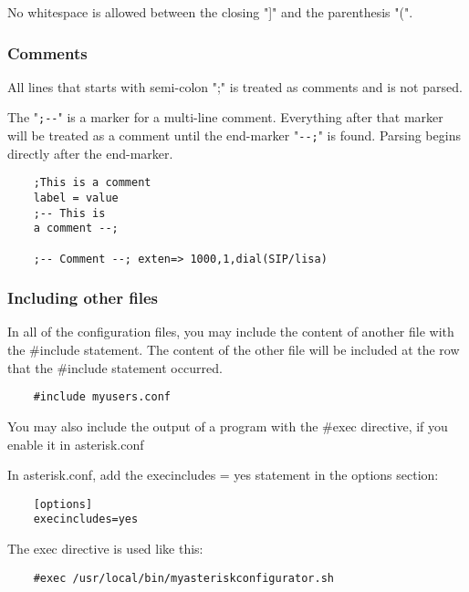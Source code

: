 No whitespace is allowed between the closing "]" and the parenthesis "(".

\subsubsection{Comments}

All lines that starts with semi-colon ";" is treated as comments
and is not parsed.

The "\verb!;--!" is a marker for a multi-line comment. Everything after
that marker will be treated as a comment until the end-marker "\verb!--;!"
is found. Parsing begins directly after the end-marker.

\begin{astlisting}
\begin{verbatim}
	;This is a comment
	label = value
	;-- This is
	a comment --;
	
	;-- Comment --; exten=> 1000,1,dial(SIP/lisa)	
\end{verbatim}
\end{astlisting}

\subsubsection{Including other files}
In all of the configuration files, you may include the content of another
file with the \#include statement. The content of the other file will be
included at the row that the \#include statement occurred.
	
\begin{astlisting}
\begin{verbatim}
	#include myusers.conf
\end{verbatim}
\end{astlisting}

You may also include the output of a program with the \#exec directive,
if you enable it in asterisk.conf
	
In asterisk.conf, add the execincludes = yes statement in the options
section:
\begin{astlisting}
\begin{verbatim}
	[options]
	execincludes=yes
\end{verbatim}
\end{astlisting}

The exec directive is used like this:
\begin{astlisting}	
\begin{verbatim}
	#exec /usr/local/bin/myasteriskconfigurator.sh
\end{verbatim}
\end{astlisting}

